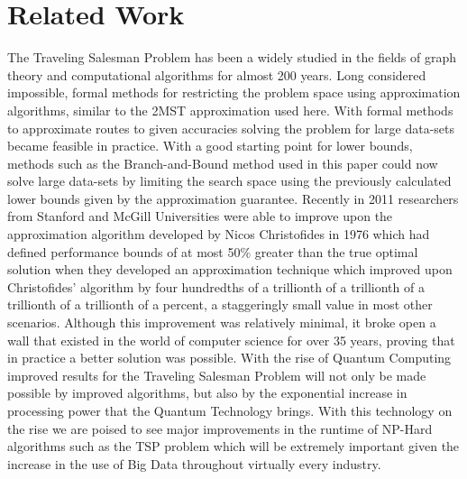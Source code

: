 \documentclass[format=sigconf]{acmart}
\begin{document}
\section*{Related Work}
The Traveling Salesman Problem has been a widely studied in the fields of graph theory and computational 
algorithms for almost 200 years. Long considered impossible, formal methods for restricting the problem space using 
approximation algorithms, similar to the 2MST approximation used here. With formal methods to approximate routes to given accuracies solving the problem 
for large data-sets became feasible in practice. With a good starting point for lower bounds, methods such as the Branch-and-Bound method used in this paper 
could now solve large data-sets by limiting the search space using the previously calculated lower bounds given by the approximation guarantee. Recently in 2011 
researchers from Stanford and McGill Universities were able to improve upon the approximation algorithm developed by Nicos Christofides 
in 1976 which had defined performance bounds of at most 50\% greater than the true optimal solution when they developed an approximation technique 
which improved upon Christofides' algorithm by four hundredths of a trillionth of a trillionth of a trillionth of a trillionth of a percent, a staggeringly small 
value in most other scenarios. Although this improvement was relatively minimal, it broke open a wall that existed in the world of computer science for over 35 years, proving 
that in practice a better solution was possible. With the rise of Quantum Computing improved results for the Traveling Salesman Problem will not only be made possible by improved algorithms, 
but also by the exponential increase in processing power that the Quantum Technology brings. With this technology on the rise we are poised to see major improvements in the runtime of NP-Hard algorithms such as the TSP 
problem which will be extremely important given the increase in the use of Big Data throughout virtually every industry. \cite{CS_Sci}
\end{document}
